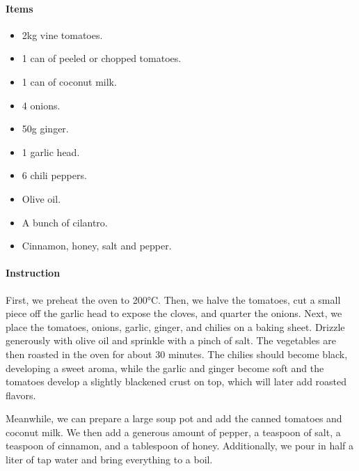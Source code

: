 \paragraph{Items}
\begin{itemize}[noitemsep]
	\item[\ding{182}] 2kg vine tomatoes.
	\item[\ding{183}] 1 can of peeled or chopped tomatoes.
	\item[\ding{184}] 1 can of coconut milk.
	\item[\ding{185}] 4 onions.
	\item[\ding{186}] 50g ginger.
	\item[\ding{187}] 1 garlic head.
	\item[\ding{188}] 6 chili peppers.
	\item[\ding{189}] Olive oil.
	\item[\ding{190}] A bunch of cilantro.
	\item[\ding{191}] Cinnamon, honey, salt and pepper.
\end{itemize}

\paragraph{Instruction} First, we preheat the oven to 200°C. Then, we halve the tomatoes, cut a small piece off the garlic head to expose the cloves, and quarter the onions. Next, we place the tomatoes, onions, garlic, ginger, and chilies on a baking sheet. Drizzle generously with olive oil and sprinkle with a pinch of salt. The vegetables are then roasted in the oven for about 30 minutes. The chilies should become black, developing a sweet aroma, while the garlic and ginger become soft and the tomatoes develop a slightly blackened crust on top, which will later add roasted flavors.

Meanwhile, we can prepare a large soup pot and add the canned tomatoes and coconut milk. We then add a generous amount of pepper, a teaspoon of salt, a teaspoon of cinnamon, and a tablespoon of honey. Additionally, we pour in half a liter of tap water and bring everything to a boil.